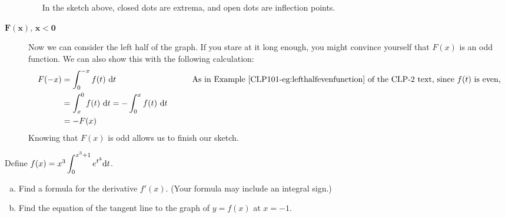 \begin{solution}
\begin{description}
\begin{itemize}
In the sketch above, closed dots are extrema, and open dots are inflection points.
\end{itemize}
\item[$\mathbf{F(x),\,x < 0}$]
Now we can consider the left half of the graph. If you stare at it long enough, you might convince yourself that $F(x)$ is an odd function. We can also show this with the following calculation:
\begin{alignat*}{3}
F(-x)&=\int_0^{-x} f(t)\ \dee{t} &&\qquad\mbox{As in Example~\eref{CLP101}{eg:lefthalfevenfunction} of the CLP-2 text, since $f(t)$ is even,}\\
&=\int_x^0 f(t)\ \dee{t}=-\int_0^x f(t)\ \dee{t}\\
&=-F(x)
\end{alignat*}
Knowing that $F(x)$ is odd allows us to finish our sketch.


\begin{center}
\end{center}

\end{description}
\end{solution}

\begin{question}[2015A]
Define $f(x)=x^3\displaystyle\int_{0}^{x^3+1} e^{t^3} \mathrm{d}t$.
\begin{enumerate}[(a)]
\item
Find a formula for the derivative $f'(x)$. (Your formula may include an integral sign.)
\item
Find the equation of the tangent line to the graph of $y=f(x)$ at $x=-1$.
\end{enumerate}
\end{question}

